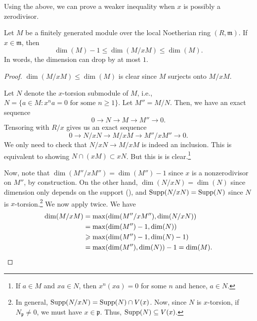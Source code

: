 \documentclass[12pt]{article}
\begin{document}
Using the above, we can prove a weaker inequality when $x$ is possibly a zerodivisor.

\begin{cor}
	Let $M$ be a finitely generated module over the local Noetherian ring $(R, \mathfrak{m})$. \newline
	If $x \in \mathfrak{m}$, then
	\begin{equation*} 
		\dim(M) - 1 \le \dim(M/xM) \le \dim(M).
	\end{equation*}
	In words, the dimension can drop by at most $1$.
\end{cor}
\begin{proof} 
	$\dim(M/xM) \le \dim(M)$ is clear since $M$ surjects onto $M/xM$.

	Let $N$ denote the $x$-torsion submodule of $M$, i.e., $N = \{a \in M : x^{n} a = 0 \text{ for some } n \ge 1\}$. Let $M'' = M/N$. Then, we have an exact sequence
	\begin{equation*} 
		0 \to N \to M \to M'' \to 0.
	\end{equation*}
	Tensoring with $R/x$ gives us an exact sequence
	\begin{equation*} 
		0 \to N/xN \to M/xM \to M''/xM'' \to 0.
	\end{equation*}
	We only need to check that $N/xN \to M/xM$ is indeed an inclusion. This is equivalent to showing $N \cap (xM) \subset xN$. But this is is clear.\footnote{If $a \in M$ and $xa \in N$, then $x^{n}(xa) = 0$ for some $n$ and hence, $a \in N$.} 

	Now, note that $\dim(M''/xM'') = \dim(M'') - 1$ since $x$ is a nonzerodivisor on $M''$, by construction. \newline
	On the other hand, $\dim(N/xN) = \dim(N)$ since dimension only depends on the support (), and $\Supp(N/xN) = \Supp(N)$ since $N$ is $x$-torsion.\footnote{In general, $\Supp(N/xN) = \Supp(N) \cap V(x)$. Now, since $N$ is $x$-torsion, if $N_{\mathfrak{p}} \neq 0$, we must have $x \in \mathfrak{p}$. Thus, $\Supp(N) \subset V(x)$.} We now apply  twice. We have
	\begin{align*} 
		\dim(M/xM) &= \max(\dim(M''/xM''), \dim(N/xN)) \\
		&= \max(\dim(M'') - 1, \dim(N)) \\
		&\ge \max(\dim(M'') - 1, \dim(N) - 1) \\
		&= \max(\dim(M''), \dim(N)) - 1 = \dim(M). \qedhere
	\end{align*}
\end{proof}
\end{document}

